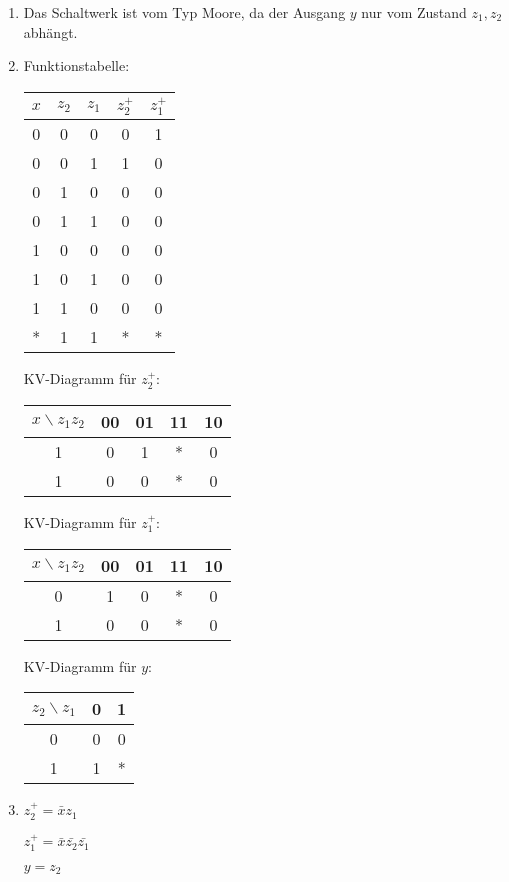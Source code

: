 \documentclass{article}
\begin{document}
\begin{solution}
  \begin{enumerate}
    \item Das Schaltwerk ist vom Typ Moore, da der Ausgang $y$ nur vom Zustand $z_1, z_2$ abhängt.
    \item Funktionstabelle:
          \begin{tabular}{ccc|cc}
            $x$ & $z_2$ & $z_1$ & $z_2^+$ & $z_1^+$ \\
            \hline
            0   & 0     & 0     & 0       & 1       \\
            0   & 0     & 1     & 1       & 0       \\
            0   & 1     & 0     & 0       & 0       \\
            0   & 1     & 1     & 0       & 0       \\
            1   & 0     & 0     & 0       & 0       \\
            1   & 0     & 1     & 0       & 0       \\
            1   & 1     & 0     & 0       & 0       \\
            *   & 1     & 1     & *       & *       \\
          \end{tabular}

          KV-Diagramm für $z_2^+$:
          \begin{tabular}{c|cccc}
            $x\backslash z_1z_2$ & 00 & 01 & 11 & 10 \\
            \hline
            1                    & 0  & 1  & *  & 0  \\
            1                    & 0  & 0  & *  & 0  \\
          \end{tabular}

          KV-Diagramm für $z_1^+$:
          \begin{tabular}{c|cccc}
            $x\backslash z_1z_2$ & 00 & 01 & 11 & 10 \\
            \hline
            0                    & 1  & 0  & *  & 0  \\
            1                    & 0  & 0  & *  & 0  \\
          \end{tabular}

          KV-Diagramm für $y$:
          \begin{tabular}{c|cc}
            $z_2\backslash z_1$ & 0 & 1 \\
            \hline
            0                   & 0 & 0 \\
            1                   & 1 & * \\
          \end{tabular}
    \item
          $z_2^+ = \bar x z_1$\par
          $z_1^+ = \bar x \bar{z_2} \bar{z_1}$\par
          $y = z_2$
  \end{enumerate}
\end{solution}
\end{document}
